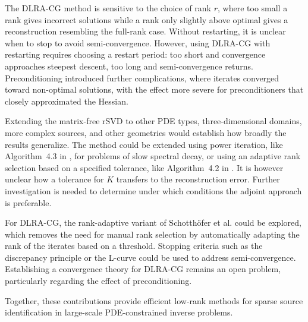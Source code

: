 The DLRA-CG method is sensitive to the choice of rank $r$, where too small a rank gives incorrect solutions while a rank only slightly above optimal gives a reconstruction resembling the full-rank case. Without restarting, it is unclear when to stop to avoid semi-convergence. However, using DLRA-CG with restarting requires choosing a restart period: too short and convergence approaches steepest descent, too long and semi-convergence returns. Preconditioning introduced further complications, where iterates converged toward non-optimal solutions, with the effect more severe for preconditioners that closely approximated the Hessian.

Extending the matrix-free rSVD to other PDE types, three-dimensional domains, more complex sources, and other geometries would establish how broadly the results generalize. The method could be extended using power iteration, like Algorithm~4.3 in \cite{halkoFindingStructureRandomness2011}, for problems of slow spectral decay, or using an adaptive rank selection based on a specified tolerance, like Algorithm~4.2 in \cite{halkoFindingStructureRandomness2011}. It is however unclear how a tolerance for $K$ transfers to the reconstruction error. Further investigation is needed to determine under which conditions the adjoint approach is preferable.

For DLRA-CG, the rank-adaptive variant of Schotthöfer et al. \cite{schotthoferLowrankLotteryTickets2022} could be explored, which removes the need for manual rank selection by automatically adapting the rank of the iterates based on a threshold. Stopping criteria such as the discrepancy principle or the L-curve \cite{hansen2010discrete} could be used to address semi-convergence. Establishing a convergence theory for DLRA-CG remains an open problem, particularly regarding the effect of preconditioning.

Together, these contributions provide efficient low-rank methods for sparse source identification in large-scale PDE-constrained inverse problems.